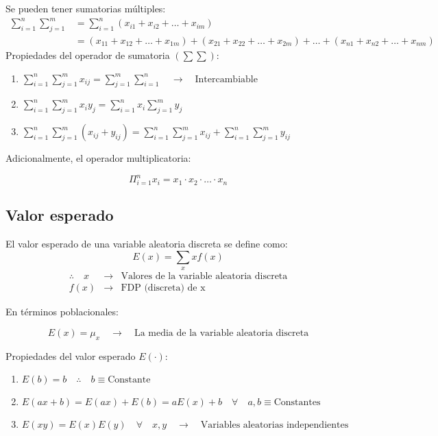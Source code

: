 \documentclass[
]{book}
\providecommand{\tightlist}{%
  \setlength{\itemsep}{0pt}\setlength{\parskip}{0pt}}
\begin{document}
Se pueden tener sumatorias múltiples:
\[
\begin{aligned}
\sum_{i=1}^n\sum_{j=1}^m &= \sum_{i=1}^n (x_{i1} + x_{i2} + \ldots + x_{im}) \\
&= (x_{11} + x_{12} + \ldots + x_{1m}) + (x_{21} + x_{22} + \ldots + x_{2m})  + \ldots + (x_{n1} + x_{n2} + \ldots + x_{nm})
\end{aligned}
\]
Propiedades del operador de sumatoria \((\sum \sum)\):

\begin{enumerate}
\def\labelenumi{\arabic{enumi}.}
\tightlist
\item
  \(\sum_{i=1}^n\sum_{j=1}^m x_{ij} = \sum_{j=1}^m\sum_{i=1}^n \quad \rightarrow \quad \text{Intercambiable}\)
\item
  \(\sum_{i=1}^n\sum_{j=1}^m x_i y_j = \sum_{i=1}^n x_i \sum_{j=1}^m y_j\)
\item
  \(\sum_{i=1}^n\sum_{j=1}^m (x_{ij} + y_{ij}) = \sum_{i=1}^n\sum_{j=1}^m x_{ij} + \sum_{i=1}^n\sum_{j=1}^m y_{ij}\)
\end{enumerate}

Adicionalmente, el operador multiplicatoria:

\[
\Pi_{i=1}^n x_i = x_1\cdot x_2 \cdot \ldots \cdot x_n
\]

\hypertarget{valor-esperado}{%
\subsection{Valor esperado}\label{valor-esperado}}

El valor esperado de una variable aleatoria discreta se define como:
\[
E(x) = \sum_x xf(x)
\]
\[
\begin{array}{ccc}
\therefore \quad x & \rightarrow & \text{Valores de la variable aleatoria discreta} \\
f(x) & \rightarrow & \text{FDP (discreta) de x}
\end{array}
\]

En términos poblacionales:

\[
E(x) = \mu_x \quad \rightarrow \quad \text{La media de la variable aleatoria discreta}
\]

Propiedades del valor esperado \(E(\cdot)\):

\begin{enumerate}
\def\labelenumi{\arabic{enumi}.}
\tightlist
\item
  \(E(b) = b \quad \therefore \quad b \equiv \text{Constante}\)
\item
  \(E(ax + b) = E(ax) + E(b) = aE(x) + b \quad \forall \quad a,b\equiv \text{Constantes}\)
\item
  \(E(xy) = E(x)E(y) \quad \forall \quad x,y \quad \rightarrow \quad \text{Variables aleatorias independientes}\)
\end{enumerate}
\end{document}
